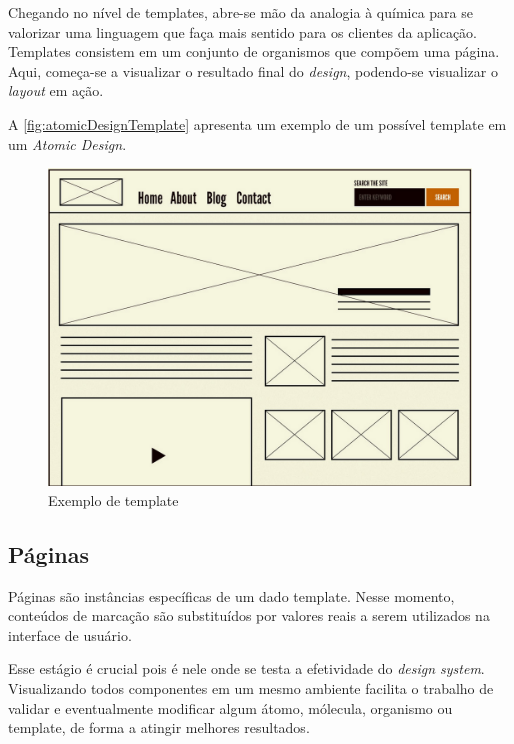 Chegando no nível de templates, abre-se mão da analogia à química para se valorizar uma linguagem que faça mais sentido para os clientes da aplicação. Templates consistem em um conjunto de organismos que compõem uma página. Aqui, começa-se a visualizar o resultado final do \textit{design}, podendo-se visualizar o \textit{layout} em ação.

A \autoref{fig:atomicDesignTemplate} apresenta um exemplo de um possível template em um \textit{Atomic Design}.

\begin{figure}
	\includegraphics[width=\linewidth]{./04-figuras/02_referencial_teorico/ad-template.png}
	\caption{Exemplo de template}
  \label{fig:atomicDesignTemplate}
\end{figure}

\subsection{Páginas}

Páginas são instâncias específicas de um dado template. Nesse momento, conteúdos de marcação são substituídos por valores reais a serem utilizados na interface de usuário.

Esse estágio é crucial pois é nele onde se testa a efetividade do \textit{design system}. Visualizando todos componentes em um mesmo ambiente facilita o trabalho de validar e eventualmente modificar algum átomo, mólecula, organismo ou template, de forma a atingir melhores resultados.

